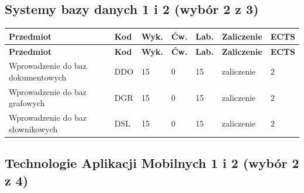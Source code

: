 \documentclass[12pt,a4paper]{article}
\newcommand{\thdrule}{\noalign{\global\setlength{\extrarowheight}{0pt}}}
\newcommand{\thdend}{\noalign{\global\setlength{\extrarowheight}{4pt}}}
\begin{document}
\subsection*{Systemy bazy danych 1 i 2 (wybór 2 z 3)}

{\scriptsize
\begin{longtable}{m{5.5cm}m{0.8cm}m{1cm}m{1cm}m{1cm}m{1.7cm}m{0.7cm}}
\thdrule\toprule
\rowcolor{pjatkRed}
{\color{white}\footnotesize\textbf{\vphantom{Ag}Przedmiot}} & {\color{white}\footnotesize\textbf{\vphantom{Ag}Kod}} & {\color{white}\footnotesize\textbf{\vphantom{Ag}Wyk.}} & {\color{white}\footnotesize\textbf{\vphantom{Ag}Ćw.}} & {\color{white}\footnotesize\textbf{\vphantom{Ag}Lab.}} & {\color{white}\footnotesize\textbf{\vphantom{Ag}Zaliczenie}} & {\color{white}\footnotesize\textbf{\vphantom{Ag}ECTS}} \\
\midrule\thdend
\endfirsthead
\thdrule\toprule
\rowcolor{pjatkRed}
{\color{white}\footnotesize\textbf{\vphantom{Ag}Przedmiot}} & {\color{white}\footnotesize\textbf{\vphantom{Ag}Kod}} & {\color{white}\footnotesize\textbf{\vphantom{Ag}Wyk.}} & {\color{white}\footnotesize\textbf{\vphantom{Ag}Ćw.}} & {\color{white}\footnotesize\textbf{\vphantom{Ag}Lab.}} & {\color{white}\footnotesize\textbf{\vphantom{Ag}Zaliczenie}} & {\color{white}\footnotesize\textbf{\vphantom{Ag}ECTS}} \\
\midrule\thdend
\endhead
\rowcolor{tableRowLight} Wprowadzenie do baz dokumentowych & DDO & 15 & 0 & 15 & {\scriptsize zaliczenie} & 2 \\
\rowcolor{tableRowAlt} Wprowadzenie do baz grafowych & DGR & 15 & 0 & 15 & {\scriptsize zaliczenie} & 2 \\
\rowcolor{tableRowLight} Wprowadzenie do baz słownikowych & DSL & 15 & 0 & 15 & {\scriptsize zaliczenie} & 2 \\
\bottomrule
\end{longtable}}

\subsection*{Technologie Aplikacji Mobilnych 1 i 2 (wybór 2 z 4)}
\end{document}
